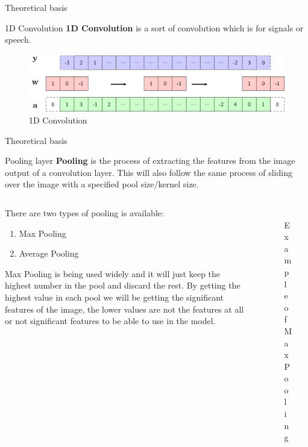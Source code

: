 \begin{frame}{Theoretical basis}
  \begin{block}{1D Convolution}
    \textbf{1D Convolution} is a sort of convolution which is for signals or speech.
  \end{block}
  \begin{figure}
    \includegraphics[width=\textwidth]{figure/conv1d_padding.png}
    \caption{1D Convolution}
  \end{figure}
\end{frame}

\begin{frame}{Theoretical basis}
  \begin{block}{Pooling layer}
    \textbf{Pooling} is the process of extracting the features from the image output of a convolution layer. This will also follow the same process of sliding over the image with a specified pool size/kernel size.
  \end{block}
  \begin{columns}
    \begin{column}{0.6\textwidth}
      There are two types of pooling is available:
      \begin{enumerate}
        \item Max Pooling
        \item Average Pooling
      \end{enumerate}
      Max Pooling is being used widely and it will just keep the highest number in the pool and discard the rest. By getting the highest value in each pool we will be getting the significant features of the image, the lower values are not the features at all or not significant features to be able to use in the model.
    \end{column}
    \begin{column}{0.4\textwidth}
      \begin{figure}
        \includegraphics[width=\textwidth]{figure/pooling.png}
        \caption{Example of Max Pooling}
      \end{figure}
    \end{column}
  \end{columns}
\end{frame}

